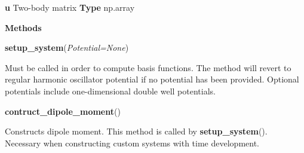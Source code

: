 \begin{tcolorbox}
{    \hspace{2em} \textbf{u}
    Two-body matrix
    \textbf{Type} np.array



    \vspace{1em}
    \textbf{Methods}

    \hspace{2em} \textbf{setup\_system}(\emph{Potential=None})
        \begin{adjustwidth}{4em}{}
        Must be called in order to compute basis functions. The method will 
        revert to regular harmonic oscillator potential if no potential has been 
        provided. Optional potentials include one-dimensional double well potentials.           
        \end{adjustwidth}
   
    \hspace{2em} \textbf{contruct\_dipole\_moment}()
        \begin{adjustwidth}{4em}{}
        Constructs dipole moment. This method is called by
        \textbf{setup\_system}(). Necessary when constructing custom systems with 
        time development.
        \end{adjustwidth}
    }
\end{tcolorbox}
